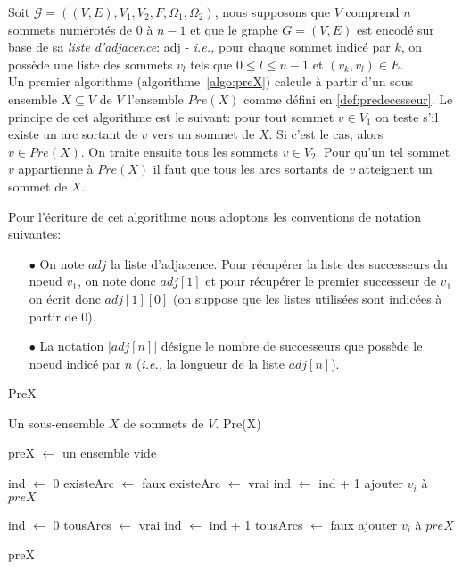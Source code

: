 Soit $\mathcal{G} = ((V,E),V_{1},V_{2}, F, \Omega _{1}, \Omega _{2})$, nous supposons que $V$ comprend $n$ sommets numérotés de $0$ à $n-1$ et que le graphe $G = (V,E)$ est encodé sur base de sa \textit{liste d'adjacence}: adj - \emph{i.e.,} pour chaque sommet indicé par $k$, on possède une liste des sommets $v_l$ tels que $0 \leq l \leq n-1$ et $(v_k, v_l) \in E$.\\

Un premier algorithme (algorithme~\ref{algo:preX}) calcule à partir d'un sous ensemble $X \subseteq V$ de $V$ l'ensemble $Pre(X)$ comme défini en \ref{def:predecesseur}. Le principe de cet algorithme est le suivant: pour tout sommet $v\in V_{1}$ on teste s'il existe un arc sortant de $v$ vers un sommet de $X$. Si c'est le cas, alors $v\in Pre(X)$. On traite ensuite tous les sommets $v \in V_{2}$. Pour qu'un tel sommet $v$ appartienne à $Pre(X)$ il faut que tous les arcs sortants de $v$ atteignent un sommet de $X$.

\begin{notations}
	Pour l'écriture de cet algorithme nous adoptons les conventions de notation suivantes:
	\begin{itemize}
		\item[$\bullet$] On note $adj$ la liste d'adjacence. Pour récupérer la liste des successeurs du noeud $v_1$, on note donc $adj[1]$ et pour récupérer le premier successeur de $v_1$ on écrit donc $adj[1][0]$ (on suppose que les listes utilisées sont indicées à partir de 0).
		\item[$\bullet$] La notation $|adj[n]|$ désigne le nombre de successeurs que possède le noeud indicé par $n$ (\emph{i.e.,} la longueur de la liste $adj[n]$).
	\end{itemize}
\end{notations}

\begin{algorithm}
	\caption{PreX}
	\label{algo:preX}
	\begin{algorithmic}[1]
		\REQUIRE Un sous-ensemble $X$ de sommets de $V$.
		\ENSURE Pre(X)
		
		\STATE preX $\leftarrow$ un ensemble vide
		
			\STATE ind $\leftarrow$ 0
			\STATE existeArc $\leftarrow$ faux
					\STATE existeArc $\leftarrow$ vrai
				\ELSE
					\STATE ind $\leftarrow$ ind + 1
				\ENDIF
			\ENDWHILE
				\STATE ajouter $v_{i}$ à $preX$
			\ENDIF
		\ENDFOR
		
			\STATE ind $\leftarrow$ 0
			\STATE tousArcs $\leftarrow$ vrai
					\STATE ind $\leftarrow$ ind + 1
				\ELSE
					\STATE  tousArcs $\leftarrow$ faux
				\ENDIF
			\ENDWHILE
				\STATE ajouter $v_{i}$ à $preX$
			\ENDIF
		\ENDFOR
		
		\RETURN preX
			
\end{algorithmic}
		
\end{algorithm}

